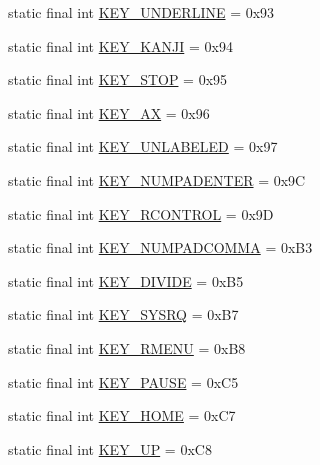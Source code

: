 \begin{DoxyCompactItemize}
\item 
static final int \mbox{\hyperlink{classorg_1_1newdawn_1_1slick_1_1_input_a4fb79407f80a55b2f9e501401c538346}{K\+E\+Y\+\_\+\+U\+N\+D\+E\+R\+L\+I\+NE}} = 0x93
\item 
static final int \mbox{\hyperlink{classorg_1_1newdawn_1_1slick_1_1_input_aa717137dedf80f2aaa8d8b4b52cd840f}{K\+E\+Y\+\_\+\+K\+A\+N\+JI}} = 0x94
\item 
static final int \mbox{\hyperlink{classorg_1_1newdawn_1_1slick_1_1_input_ab1b803b70c11aab1f4582faf412be6ea}{K\+E\+Y\+\_\+\+S\+T\+OP}} = 0x95
\item 
static final int \mbox{\hyperlink{classorg_1_1newdawn_1_1slick_1_1_input_a06292938497cc8fe714af3d7d6dfe6f7}{K\+E\+Y\+\_\+\+AX}} = 0x96
\item 
static final int \mbox{\hyperlink{classorg_1_1newdawn_1_1slick_1_1_input_ac9b310c510642366aa5bdc78150db37e}{K\+E\+Y\+\_\+\+U\+N\+L\+A\+B\+E\+L\+ED}} = 0x97
\item 
static final int \mbox{\hyperlink{classorg_1_1newdawn_1_1slick_1_1_input_ae4b58e7dfd76548109f81cd7d97686ec}{K\+E\+Y\+\_\+\+N\+U\+M\+P\+A\+D\+E\+N\+T\+ER}} = 0x9C
\item 
static final int \mbox{\hyperlink{classorg_1_1newdawn_1_1slick_1_1_input_a5cd19bb1f1f0369f40ab005e3eced1fc}{K\+E\+Y\+\_\+\+R\+C\+O\+N\+T\+R\+OL}} = 0x9D
\item 
static final int \mbox{\hyperlink{classorg_1_1newdawn_1_1slick_1_1_input_ab692a460df6e4553c728f079441a5b8b}{K\+E\+Y\+\_\+\+N\+U\+M\+P\+A\+D\+C\+O\+M\+MA}} = 0x\+B3
\item 
static final int \mbox{\hyperlink{classorg_1_1newdawn_1_1slick_1_1_input_a7b557c358d8e65d1ce7dede7ed8b16c7}{K\+E\+Y\+\_\+\+D\+I\+V\+I\+DE}} = 0x\+B5
\item 
static final int \mbox{\hyperlink{classorg_1_1newdawn_1_1slick_1_1_input_a08b2b9f307ac2907a7679273e72d6feb}{K\+E\+Y\+\_\+\+S\+Y\+S\+RQ}} = 0x\+B7
\item 
static final int \mbox{\hyperlink{classorg_1_1newdawn_1_1slick_1_1_input_acf842a77f8ed94b795d68764c848d631}{K\+E\+Y\+\_\+\+R\+M\+E\+NU}} = 0x\+B8
\item 
static final int \mbox{\hyperlink{classorg_1_1newdawn_1_1slick_1_1_input_aa8adf7453c013ff7730ca64093f9bb72}{K\+E\+Y\+\_\+\+P\+A\+U\+SE}} = 0x\+C5
\item 
static final int \mbox{\hyperlink{classorg_1_1newdawn_1_1slick_1_1_input_acf28ed82993ec3e8a19429e334a25bae}{K\+E\+Y\+\_\+\+H\+O\+ME}} = 0x\+C7
\item 
static final int \mbox{\hyperlink{classorg_1_1newdawn_1_1slick_1_1_input_a13df31ea42f8f9f22fd3e957a71e79df}{K\+E\+Y\+\_\+\+UP}} = 0x\+C8

\end{DoxyCompactItemize}
